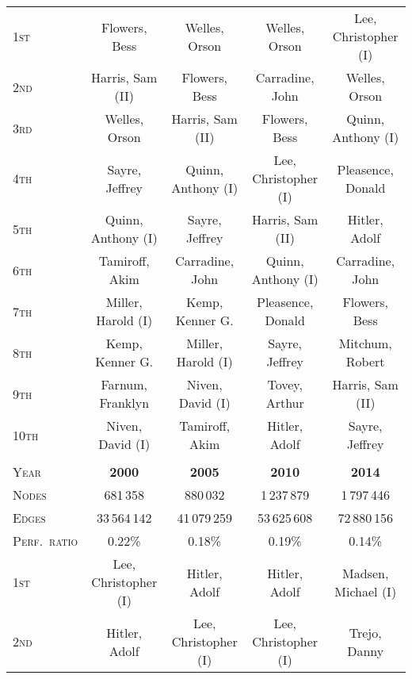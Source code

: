 \documentclass{acm_proc_article-sp}
\begin{document}
\begin{small}
\begin{table*}[b]
\begin{tabular}{|l|c|c|c|c|}
\hline
\textsc{1st} &               Flowers, Bess  &               Welles, Orson  &               Welles, Orson  &        Lee, Christopher (I) \\ 
\textsc{2nd} &            Harris, Sam (II)  &               Flowers, Bess  &             Carradine, John  &               Welles, Orson \\ 
\textsc{3rd} &               Welles, Orson  &            Harris, Sam (II)  &               Flowers, Bess  &          Quinn, Anthony (I) \\ 
\textsc{4th} &              Sayre, Jeffrey  &          Quinn, Anthony (I)  &        Lee, Christopher (I)  &           Pleasence, Donald \\ 
\textsc{5th} &          Quinn, Anthony (I)  &              Sayre, Jeffrey  &            Harris, Sam (II)  &               Hitler, Adolf \\ 
\textsc{6th} &              Tamiroff, Akim  &             Carradine, John  &          Quinn, Anthony (I)  &             Carradine, John \\ 
\textsc{7th} &          Miller, Harold (I)  &             Kemp, Kenner G.  &           Pleasence, Donald  &               Flowers, Bess \\ 
\textsc{8th} &             Kemp, Kenner G.  &          Miller, Harold (I)  &              Sayre, Jeffrey  &             Mitchum, Robert \\ 
\textsc{9th} &            Farnum, Franklyn  &            Niven, David (I)  &               Tovey, Arthur  &            Harris, Sam (II) \\ 
\textsc{10th} &             Niven, David (I)  &               Tamiroff, Akim  &                Hitler, Adolf  &               Sayre, Jeffrey \\ 
\hline
\multicolumn{5}{c}{} \\ 
\hline
\textsc{Year} & \textbf{2000} & \textbf{2005} & \textbf{2010} & \textbf{2014}\\ 
\textsc{Nodes} & 681\,358 & 880\,032 & 1\,237\,879 & 1\,797\,446\\ 
\textsc{Edges} & 33\,564\,142 & 41\,079\,259 & 53\,625\,608 & 72\,880\,156\\ 
\textsc{Perf.~ratio} & 0.22\% & 0.18\% & 0.19\% & 0.14\%\\ 
\hline
\textsc{1st} &        Lee, Christopher (I)  &               Hitler, Adolf  &               Hitler, Adolf  &         Madsen, Michael (I) \\ 
\textsc{2nd} &               Hitler, Adolf  &        Lee, Christopher (I)  &        Lee, Christopher (I)  &                Trejo, Danny \\ 

\end{tabular}
\end{table*}
\end{small}
\end{document}
